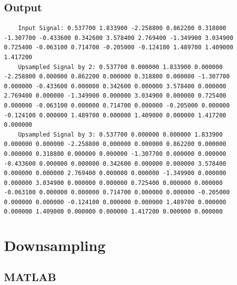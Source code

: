 \documentclass[a4paper,12pt]{article}
\begin{document}
\subsection*{Output}
\begin{lstlisting}
    Input Signal: 0.537700 1.833900 -2.258800 0.862200 0.318800 -1.307700 -0.433600 0.342600 3.578400 2.769400 -1.349900 3.034900 0.725400 -0.063100 0.714700 -0.205000 -0.124100 1.489700 1.409000 1.417200 
    Upsampled Signal by 2: 0.537700 0.000000 1.833900 0.000000 -2.258800 0.000000 0.862200 0.000000 0.318800 0.000000 -1.307700 0.000000 -0.433600 0.000000 0.342600 0.000000 3.578400 0.000000 2.769400 0.000000 -1.349900 0.000000 3.034900 0.000000 0.725400 0.000000 -0.063100 0.000000 0.714700 0.000000 -0.205000 0.000000 -0.124100 0.000000 1.489700 0.000000 1.409000 0.000000 1.417200 0.000000 
    Upsampled Signal by 3: 0.537700 0.000000 0.000000 1.833900 0.000000 0.000000 -2.258800 0.000000 0.000000 0.862200 0.000000 0.000000 0.318800 0.000000 0.000000 -1.307700 0.000000 0.000000 -0.433600 0.000000 0.000000 0.342600 0.000000 0.000000 3.578400 0.000000 0.000000 2.769400 0.000000 0.000000 -1.349900 0.000000 0.000000 3.034900 0.000000 0.000000 0.725400 0.000000 0.000000 -0.063100 0.000000 0.000000 0.714700 0.000000 0.000000 -0.205000 0.000000 0.000000 -0.124100 0.000000 0.000000 1.489700 0.000000 0.000000 1.409000 0.000000 0.000000 1.417200 0.000000 0.000000
\end{lstlisting}

\section{Downsampling}
\subsection{MATLAB}
\end{document}
